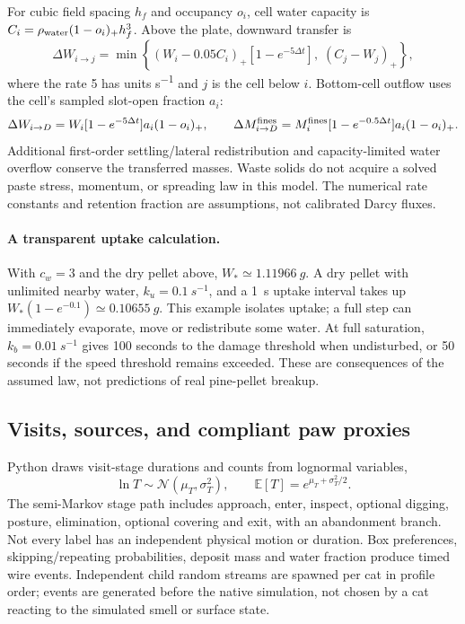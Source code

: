 For cubic field spacing $h_f$ and occupancy $o_i$, cell water capacity is
$C_i=\rho_{\rm water}(1-o_i)_+h_f^3$. Above the plate, downward transfer is
\begin{equation}
 \Delta W_{i\to j}=\min\left\{(W_i-0.05C_i)_+
           [1-e^{-5\Delta t}],\;(C_j-W_j)_+\right\}, \label{eq:drainage}
\end{equation}
where the rate 5 has units \si{s^{-1}} and $j$ is the cell below $i$.
Bottom-cell outflow uses the cell's sampled slot-open fraction $a_i$:
\begin{equation}
 \Delta W_{i\to D}=W_i[1-e^{-5\Delta t}]a_i(1-o_i)_+,\qquad
 \Delta M^{\rm fines}_{i\to D}=M_i^{\rm fines}
                    [1-e^{-0.5\Delta t}]a_i(1-o_i)_+.
\end{equation}
Additional first-order settling/lateral redistribution and capacity-limited water
overflow conserve the transferred masses. Waste solids do not acquire a solved
paste stress, momentum, or spreading law in this model. The numerical rate
constants and retention fraction are assumptions, not calibrated Darcy fluxes.

\paragraph{A transparent uptake calculation.}
With $c_w=3$ and the dry pellet above, $W_*\simeq\SI{1.11966}{g}$.
A dry pellet with unlimited nearby water, $k_u=\SI{0.1}{s^{-1}}$, and a
\SI{1}{s} uptake interval takes up $W_*(1-e^{-0.1})\simeq\SI{0.10655}{g}$.
This example isolates uptake; a full step can immediately evaporate, move or
redistribute some water. At full saturation, $k_b=\SI{0.01}{s^{-1}}$ gives
100 seconds to the damage threshold when undisturbed, or 50 seconds if the
speed threshold remains exceeded. These are consequences of the assumed law,
not predictions of real pine-pellet breakup.

\subsection{Visits, sources, and compliant paw proxies}
Python draws visit-stage durations and counts from lognormal variables,
\begin{equation}
 \ln T\sim\mathcal N(\mu_T,\sigma_T^2),\qquad
 \mathbb E[T]=e^{\mu_T+\sigma_T^2/2}.
\end{equation}
The semi-Markov stage path includes approach, enter, inspect, optional digging,
posture, elimination, optional covering and exit, with an abandonment branch.
Not every label has an independent physical motion or duration. Box preferences,
skipping/repeating probabilities, deposit mass and water fraction produce timed
wire events. Independent child random streams are spawned per cat in profile
order; events are generated before the native simulation, not chosen by a cat
reacting to the simulated smell or surface state.


